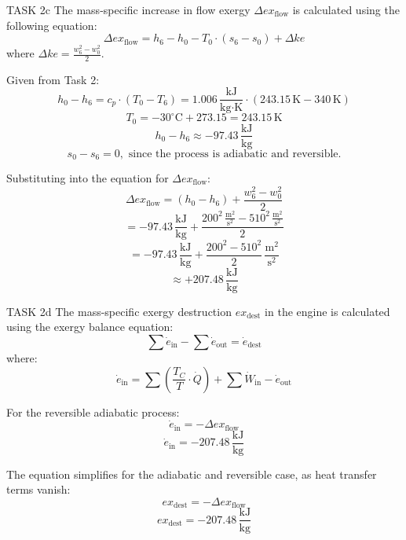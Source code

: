 TASK 2c  
The mass-specific increase in flow exergy \( \Delta ex_{\text{flow}} \) is calculated using the following equation:  
\[
\Delta ex_{\text{flow}} = h_6 - h_0 - T_0 \cdot (s_6 - s_0) + \Delta ke
\]
where \( \Delta ke = \frac{w_6^2 - w_0^2}{2} \).  

Given from Task 2:  
\[
h_0 - h_6 = c_p \cdot (T_0 - T_6) = 1.006 \, \frac{\text{kJ}}{\text{kg·K}} \cdot (243.15 \, \text{K} - 340 \, \text{K})
\]
\[
T_0 = -30^\circ\text{C} + 273.15 = 243.15 \, \text{K}
\]
\[
h_0 - h_6 \approx -97.43 \, \frac{\text{kJ}}{\text{kg}}
\]
\[
s_0 - s_6 = 0, \text{ since the process is adiabatic and reversible.}
\]

Substituting into the equation for \( \Delta ex_{\text{flow}} \):  
\[
\Delta ex_{\text{flow}} = (h_0 - h_6) + \frac{w_6^2 - w_0^2}{2}
\]
\[
= -97.43 \, \frac{\text{kJ}}{\text{kg}} + \frac{200^2 \, \frac{\text{m}^2}{\text{s}^2} - 510^2 \, \frac{\text{m}^2}{\text{s}^2}}{2}
\]
\[
= -97.43 \, \frac{\text{kJ}}{\text{kg}} + \frac{200^2 - 510^2}{2} \, \frac{\text{m}^2}{\text{s}^2}
\]
\[
\approx +207.48 \, \frac{\text{kJ}}{\text{kg}}
\]

TASK 2d  
The mass-specific exergy destruction \( ex_{\text{dest}} \) in the engine is calculated using the exergy balance equation:  
\[
\sum \dot{e}_{\text{in}} - \sum \dot{e}_{\text{out}} = \dot{e}_{\text{dest}}
\]
where:  
\[
\dot{e}_{\text{in}} = \sum \left( \frac{T_C}{T} \cdot \dot{Q} \right) + \sum \dot{W}_{\text{in}} - \dot{e}_{\text{out}}
\]

For the reversible adiabatic process:  
\[
\dot{e}_{\text{in}} = -\Delta ex_{\text{flow}}
\]
\[
\dot{e}_{\text{in}} = -207.48 \, \frac{\text{kJ}}{\text{kg}}
\]

The equation simplifies for the adiabatic and reversible case, as heat transfer terms vanish:  
\[
ex_{\text{dest}} = -\Delta ex_{\text{flow}}
\]
\[
ex_{\text{dest}} = -207.48 \, \frac{\text{kJ}}{\text{kg}}
\]